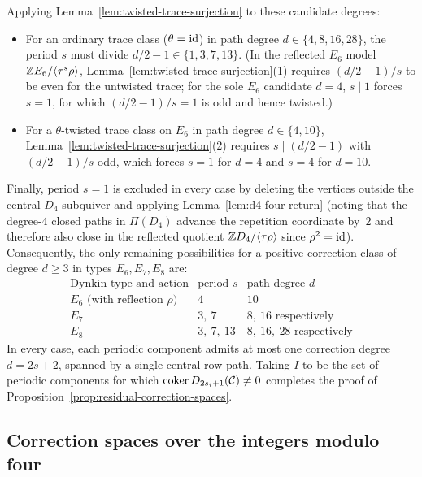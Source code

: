 Applying Lemma~\ref{lem:twisted-trace-surjection} to these candidate degrees:
\begin{itemize}
\item For an ordinary trace class ($\theta=\operatorname{id}$) in path degree $d\in\{4,8,16,28\}$, the period $s$ must divide $d/2-1\in\{1,3,7,13\}$. (In the reflected $E_6$ model $\mathbb Z E_6/\langle\tau^s\rho\rangle$, Lemma~\ref{lem:twisted-trace-surjection}(1) requires $(d/2-1)/s$ to be even for the untwisted trace; for the sole $E_6$ candidate $d=4$, $s\mid1$ forces $s=1$, for which $(d/2-1)/s=1$ is odd and hence twisted.)
\item For a $\theta$-twisted trace class on $E_6$ in path degree $d\in\{4,10\}$, Lemma~\ref{lem:twisted-trace-surjection}(2) requires $s\mid(d/2-1)$ with $(d/2-1)/s$ odd, which forces $s=1$ for $d=4$ and $s=4$ for $d=10$.
\end{itemize}
Finally, period $s=1$ is excluded in every case by deleting the vertices outside the central $D_4$ subquiver and applying Lemma~\ref{lem:d4-four-return} (noting that the degree-$4$ closed paths in $\Pi(D_4)$ advance the repetition coordinate by~$2$ and therefore also close in the reflected quotient $\mathbb Z D_4/\langle\tau\rho\rangle$ since $\rho^2=\operatorname{id}$). Consequently, the only remaining possibilities for a positive correction class of degree $d\geq3$ in types $E_6,E_7,E_8$ are:
\begin{equation}
  \label{eq:exceptional-correction-bounds}
  \begin{array}{c|c|c}
  \text{Dynkin type and action}&\text{period }s&\text{path degree }d\\ \hline
  E_6\text{ (with reflection }\rho\text{)}&4&10\\
  E_7&3,\ 7&8,\ 16\text{ respectively}\\
  E_8&3,\ 7,\ 13&8,\ 16,\ 28\text{ respectively}
  \end{array}
\end{equation}
In every case, each periodic component admits at most one correction degree $d=2s+2$, spanned by a single central row path. Taking $I$ to be the set of periodic components for which $\operatorname{coker}D_{2s_i+1}(\mathcal C)\ne0$ completes the proof of Proposition~\ref{prop:residual-correction-spaces}.

\subsection{Correction spaces over the integers modulo four}
\label{app:integral-corrections}

